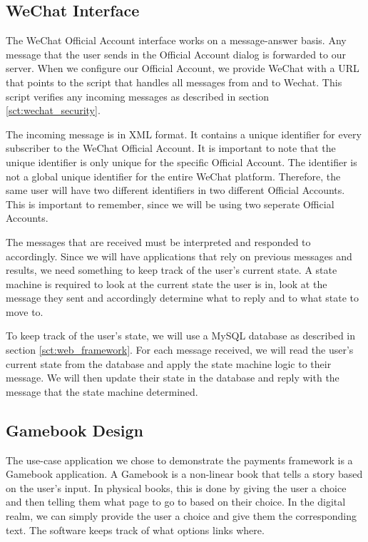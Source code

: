 \subsection{WeChat Interface}

The WeChat Official Account interface works on a message-answer basis. Any message that the user sends in the Official Account dialog is forwarded to our server. When we configure our Official Account, we provide WeChat with a URL that points to the script that handles all messages from and to Wechat. This script verifies any incoming messages as described in section \ref{sct:wechat_security}.

The incoming message is in XML format. It contains a unique identifier for every subscriber to the WeChat Official Account. It is important to note that the unique identifier is only unique for the specific Official Account. The identifier is not a global unique identifier for the entire WeChat platform. Therefore, the same user will have two different identifiers in two different Official Accounts. This is important to remember, since we will be using two seperate Official Accounts.

The messages that are received must be interpreted and responded to accordingly. Since we will have applications that rely on previous messages and results, we need something to keep track of the user's current state. A state machine is required to look at the current state the user is in, look at the message they sent and accordingly determine what to reply and to what state to move to. 

To keep track of the user's state, we will use a MySQL database as described in section \ref{sct:web_framework}. For each message received, we will read the user's current state from the database and apply the state machine logic to their message. We will then update their state in the database and reply with the message that the state machine determined.

\subsection{Gamebook Design}
\label{sct:gamebook_design}

The use-case application we chose to demonstrate the payments framework is a Gamebook application. A Gamebook is a non-linear book that tells a story based on the user's input. In physical books, this is done by giving the user a choice and then telling them what page to go to based on their choice. In the digital realm, we can simply provide the user a choice and give them the corresponding text. The software keeps track of what options links where.

